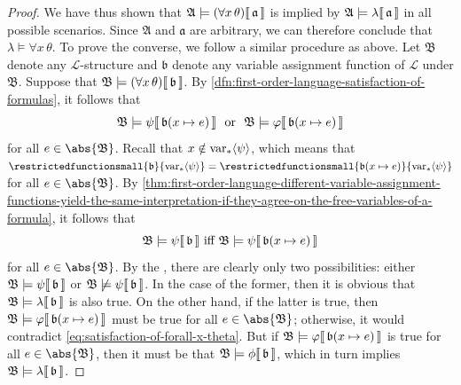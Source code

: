 \begin{proof}
    \vspace{0.3cm}
    \noindent
    We have thus shown that \( \folwffsatisfaction{\mathfrak{A}}{\mleft( \forall x \, \theta \mright)}{\mathfrak{a}} \) is implied by
    \(  \mathfrak{A} \models \lambda\llbracket\, \mathfrak{a} \,\rrbracket \) in all possible scenarios.
    Since \( \mathfrak{A} \) and \( \mathfrak{a} \) are arbitrary, we can therefore conclude that \( \lambda \models \forall x \, \theta \).
    To prove the converse, we follow a similar procedure as above. Let \( \mathfrak{B} \) denote any \( \mathcal{L} \)-structure and \( \mathfrak{b} \)
    denote any variable assignment function of \( \mathcal{L} \) under \( \mathfrak{B} \).
    Suppose that \( \folwffsatisfaction{\mathfrak{B}}{\mleft( \forall x \, \theta \mright)}{\mathfrak{b}} \).
    By \cref{dfn:first-order-language-satisfaction-of-formulas}, it follows that
    \begin{equation}
        \label{eq:satisfaction-of-forall-x-theta}
        \folwffsatisfaction{\mathfrak{B}}{\psi}{ \folmodifiedvariableassignmentfunction{\mathfrak{b}}{x}{e} } \ \ \text{or}
        \ \ \folwffsatisfaction{\mathfrak{B}}{\varphi}{ \folmodifiedvariableassignmentfunction{\mathfrak{b}}{x}{e} }
    \end{equation}
    for all \( e \in \abs{\mathfrak{B}} \).
    Recall that \( x \notin \operatorname{var}_{\ast} \langle\psi\rangle \), which means that
    \( \restrictedfunctionsmall{\mathfrak{b}}{ \folfreevars{\psi} } =
       \restrictedfunctionsmall{ \folmodifiedvariableassignmentfunction{\mathfrak{b}}{x}{e} }{ \folfreevars{\psi} }
    \) for all \( e \in \abs{\mathfrak{B}} \).
    By \cref{thm:first-order-language-different-variable-assignment-functions-yield-the-same-interpretation-if-they-agree-on-the-free-variables-of-a-formula},
    it follows that
    \begin{equation}
        \label{eq:satisfaction-of-psi-is-independent-of-x}
        \folwffsatisfaction{\mathfrak{B}}{\psi}{\mathfrak{b}} \ \text{iff}
        \ \folwffsatisfaction{\mathfrak{B}}{\psi}{ \folmodifiedvariableassignmentfunction{\mathfrak{b}}{x}{e} }
    \end{equation}
    for all \( e \in \abs{\mathfrak{B}} \).
    By the , there are clearly only two possibilities:
    either \(  \mathfrak{B} \models \psi\llbracket\, \mathfrak{b} \,\rrbracket \) or \(  \mathfrak{B} \not\models \psi\llbracket\,\mathfrak{b} \,\rrbracket \).
    In the case of the former, then it is obvious that \(  \mathfrak{B} \models \lambda\llbracket\, \mathfrak{b} \,\rrbracket \) is also true.
    On the other hand, if the latter is true, then \( \folwffsatisfaction{\mathfrak{B}}{\varphi}{ \folmodifiedvariableassignmentfunction{\mathfrak{b}}{x}{e} } \)
    must be true for all \( e \in \abs{\mathfrak{B}} \);
    otherwise, it would contradict \eqref{eq:satisfaction-of-forall-x-theta}.
    But if \( \folwffsatisfaction{\mathfrak{B}}{\varphi}{ \folmodifiedvariableassignmentfunction{\mathfrak{b}}{x}{e} } \)
    is true for all \( e \in \abs{\mathfrak{B}} \), then it must be that \(  \mathfrak{B} \models \phi\llbracket\, \mathfrak{b} \,\rrbracket \), which in turn implies
    \(  \mathfrak{B} \models \lambda\llbracket\, \mathfrak{b} \,\rrbracket \).


\end{proof}

